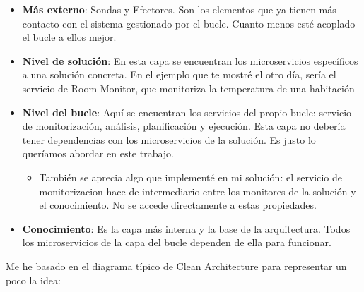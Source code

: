 \begin{itemize}
  \item \textbf{Más externo}: Sondas y Efectores. Son los elementos que ya tienen más contacto con el sistema gestionado por el bucle. Cuanto menos esté acoplado el bucle a ellos mejor.

  \item \textbf{Nivel de solución}: En esta capa se encuentran los microservicios específicos a una solución concreta. En el ejemplo que te mostré el otro día, sería el servicio de Room Monitor, que monitoriza la temperatura de una habitación

  \item \textbf{Nivel del bucle}: Aquí se encuentran los servicios del propio bucle: servicio de monitorización, análisis, planificación y ejecución. Esta capa no debería tener dependencias con los microservicios de la solución. Es justo lo queríamos abordar en este trabajo.

  \begin{itemize}
    \item También se aprecia algo que implementé en mi solución: el servicio de monitorizacion hace de intermediario entre los monitores de la solución y el conocimiento. No se accede directamente a estas propiedades.
  \end{itemize}

  \item \textbf{Conocimiento}: Es la capa más interna y la base de la arquitectura. Todos los microservicios de la capa del bucle dependen de ella para funcionar.

\end{itemize}

Me he basado en el diagrama típico de Clean Architecture para representar un poco la idea:

